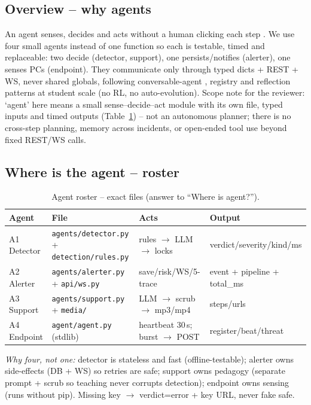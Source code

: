 \documentclass[11pt,a4paper]{article}
\begin{document}
\subsection{Overview -- why agents}
An agent senses, decides and acts without a human clicking each step \cite{FangHack24,Castro25,AutoGen24}. We use four small agents instead of one function so each is testable, timed and replaceable: two decide (detector, support), one persists/notifies (alerter), one senses PCs (endpoint). They communicate only through typed dicts + REST + WS, never shared globals, following conversable-agent \cite{AutoGen24}, registry \cite{SAGA25} and reflection \cite{Aegis25} patterns at student scale (no RL, no auto-evolution). Scope note for the reviewer: `agent' here means a small sense--decide--act module with its own file, typed inputs and timed outputs (Table~\ref{tab:agents}) -- not an autonomous planner; there is no cross-step planning, memory across incidents, or open-ended tool use beyond fixed REST/WS calls.

\subsection{Where is the agent -- roster}
\begin{table}[h]\centering\caption{Agent roster -- exact files (answer to ``Where is agent?'').}\label{tab:agents}\begin{tabular}{@{}llll@{}}\toprule Agent & File & Acts & Output\\\midrule
A1 Detector & \texttt{agents/detector.py} + \texttt{detection/rules.py} & rules $\rightarrow$ LLM $\rightarrow$ locks & verdict/severity/kind/ms\\
A2 Alerter & \texttt{agents/alerter.py} + \texttt{api/ws.py} & save/risk/WS/5-trace & event + pipeline + total\_ms\\
A3 Support & \texttt{agents/support.py} + \texttt{media/} & LLM $\rightarrow$ scrub $\rightarrow$ mp3/mp4 & steps/urls\\
A4 Endpoint & \texttt{agent/agent.py} (stdlib) & heartbeat 30\,s; burst $\rightarrow$ POST & register/beat/threat\\\bottomrule\end{tabular}\end{table}
\noindent\textit{Why four, not one:} detector is stateless and fast (offline-testable); alerter owns side-effects (DB + WS) so retries are safe; support owns pedagogy (separate prompt + scrub so teaching never corrupts detection); endpoint owns sensing (runs without pip). Missing key $\rightarrow$ verdict=error + key URL, never fake safe.
\end{document}
